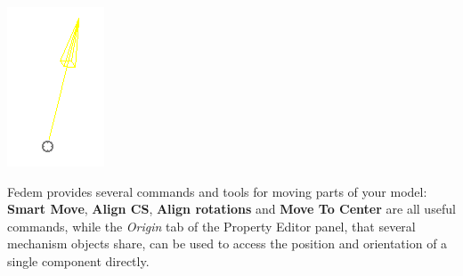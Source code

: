 \hfill\begin{minipage}{0.22\textwidth}
  \includegraphics[width=\textwidth]{Figures/3-Default-createDirection-sec-3-4}
\end{minipage}



Fedem provides several commands and tools for moving parts of your model:
\textbf{Smart Move}, \textbf{Align CS}, \textbf{Align rotations} and
\textbf{Move To Center} are all useful commands, while the {\sl Origin} tab
of the Property Editor panel, that several mechanism objects share, can be used
to access the position and orientation of a single component directly.


